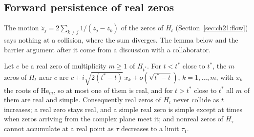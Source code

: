 \subsection{Forward persistence of real zeros}\label{sec:ft:persist}

The motion $\dot z_j=2\sum_{k\ne j}1/(z_j-z_k)$ of the zeros of $H_t$ (Section~\ref{sec:ch21:flow}) says nothing at a collision, where the sum diverges. The lemma below and the barrier argument after it come from a discussion with a collaborator.

\begin{lemma}\label{ft:lem:split}
Let $c$ be a real zero of multiplicity $m\ge1$ of $H_{t^*}$. For $t<t^*$ close to $t^*$, the $m$ zeros of $H_t$ near $c$ are $c+i\sqrt{2(t^*-t)}\,x_k+o(\sqrt{t^*-t})$, $k=1,\dots,m$, with $x_k$ the roots of $\mathrm{He}_m$, so at most one of them is real, and for $t>t^*$ close to $t^*$ all $m$ of them are real and simple. Consequently real zeros of $H_t$ never collide as $t$ increases; a real zero stays real, and a simple real zero is simple except at times when zeros arriving from the complex plane meet it; and nonreal zeros of $H_\tau$ cannot accumulate at a real point as $\tau$ decreases to a limit $\tau_1$.
\end{lemma}

